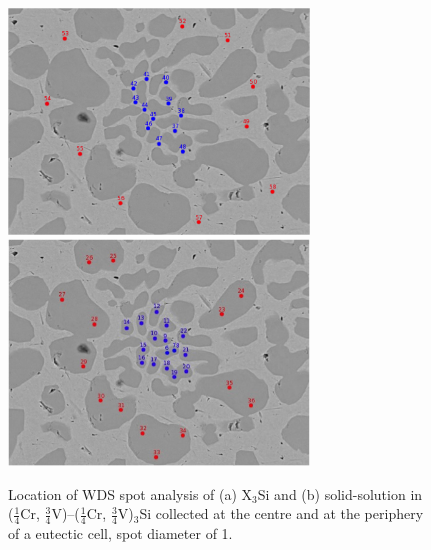 %
%
%
%


%

\begin{figure}[htbp]
\begin{center}
\includegraphics[width=8cm]{25Cr75VSi_spot2}
\includegraphics[width=8cm]{25Cr75VSi_spot1}
\caption{Location of WDS spot analysis of (a) X$_3$Si and (b) solid-solution in ($\frac{1}{4}$Cr, $\frac{3}{4}$V)--($\frac{1}{4}$Cr, $\frac{3}{4}$V)$_3$Si collected at the centre and at the periphery of a eutectic cell, spot diameter of 1\micro\metre.}
\label{fig:25Cr_middleii_spot}
\end{center}
\end{figure}
%



